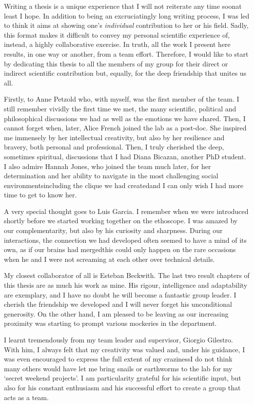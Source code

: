 Writing a thesis is a unique experience that I will not reiterate any time soon\emd{}at least I hope.
In addition to being an excruciatingly long writing process, I was led to think it aims at showing one's \emph{individual} contribution to her or his field.
Sadly, this format makes it difficult to convey my personal scientific experience of, instead, a highly collaborative exercise.
In truth, all the work I present here results, in one way or another, from a team effort.
Therefore, I would like to start by dedicating this thesis to all the members of my group for their direct or indirect scientific contribution but, equally, for the deep friendship that unites us all.

Firstly, to Anne Petzold who, with myself, was the first member of the team. 
I still remember vividly the first time we met, the many scientific, political and philosophical discussions we had as well as the emotions we have shared. 
Then, I cannot forget when, later, Alice French joined the lab as a post-doc. 
She inspired me immensely by her intellectual creativity, but also by her resilience and bravery, both personal and professional.
Then, I truly cherished the deep, sometimes spiritual, discussions that I had Diana Bicazan, another PhD student.
I also admire Hannah Jones, who joined the team much later, for her determination and her ability to navigate in the most challenging social 
environments\emd{}including the clique we had created\emd{}and I can only wish I had more time to get to know her.

A very special thought goes to Luis Garcia. I remember when we were introduced shortly before we started working together on the ethoscope.
I was amazed by our complementarity, but also by his curiosity and sharpness.
During our interactions, the connection we had developed often seemed to have a mind of its own, as if our brains had merged\emd{}this could only happen on the rare occasions when he and I were not screaming at each other over technical details.

My closest collaborator of all is Esteban Beckwith. The last two result chapters of this thesis are as much his work as mine.
His rigour, intelligence and adaptability are exemplary, and I have no doubt he will become a fantastic group leader.
I cherish the friendship we developed and I will never forget his unconditional generosity.
On the other hand, I am pleased to be leaving as our increasing proximity was starting to prompt various mockeries in the department.

I learnt tremendously from my team leader and supervisor, Giorgio Gilestro. 
With him, I always felt that my creativity was valued and, under his guidance, I was even encouraged to express the full extent of my craziness\emd{}I do not think many others would have let me bring snails or earthworms to the lab for my `secret weekend projects'.
I am particularity grateful for his scientific input, but also for his constant enthusiasm and his successful effort to create a group that acts as a team.

